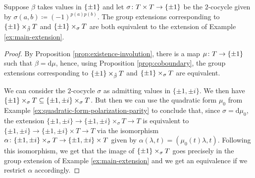 \begin{lemma}\label{lemma:tildeT-finally}
    Suppose $\beta$ takes values in $\{ \pm 1 \}$ and let $\sigma\colon T\times T \to \{ \pm 1 \}$ be the $2$-cocycle given by $\sigma(a,b) \coloneqq (-1)^{p(a)p(b)}$. 
    The group extensions corresponding to $\{ \pm 1 \} \times_{\tilde\beta} T$ and $\{ \pm 1 \} \times_\sigma T$ are both equivalent to the extension of Example 
    \ref{ex:main-extension}. 
\end{lemma}

\begin{proof}
    By Proposition \ref{prop:existence-involution}, there is a map $\mu\colon T \to \{\pm 1\}$ such that $\beta = \mathrm{d}\mu$, hence, using Proposition \ref{prop:coboundary}, the group extensions corresponding to $\{ \pm 1 \} \times_{\tilde\beta} T$ and $\{ \pm 1 \} \times_\sigma T$ are equivalent. 
    
    We can consider the $2$-cocycle $\sigma$ as admitting values in $\{\pm 1, \pm i\}$. 
    We then have $\{ \pm 1 \} \times_\sigma T \subseteq \{\pm 1, \pm i\} \times_\sigma T$. 
    But then we can use the quadratic form $\mu_0$ from Example \ref{ex:quadratic-form-polarization-parity} to conclude that, since $\sigma = \mathrm{d} \mu_0$, the extension $\{\pm 1, \pm i\} \to \{\pm 1, \pm i\} \times_\sigma T \to T$ is equivalent to $\{\pm 1, \pm i\} \to \{\pm 1, \pm i\} \times T \to T$ via the isomorphism $\alpha\colon \{\pm 1, \pm i\} \times_\sigma T \to \{\pm 1, \pm i\} \times T$ given by $\alpha(\lambda, t) = (\mu_0(t) \lambda, t)$. 
    Following this isomorphism, we get that the image of $\{ \pm 1 \} \times_\sigma T$ goes precisely in the group extension of Example \ref{ex:main-extension} and we get an equivalence if we restrict $\alpha$ accordingly.
\end{proof}








